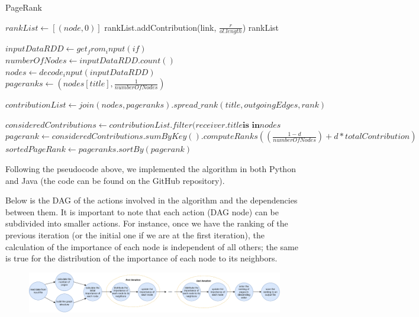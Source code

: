 \begin{algorithm}[H]
	\caption{PageRank}\label{General}
		\begin{algorithmic}[1]
			
				\State $rankList \gets [(node, 0)]$
						\State rankList.addContribution(link, $\frac{r}{ol.length}$)
					\EndFor
				\EndIf
				\State \Return rankList
			\EndProcedure
			
			
			
				\State $inputDataRDD \gets get_from_input(if)$
				\State $numberOfNodes \gets inputDataRDD.count()$
				\State $nodes \gets decode_input(inputDataRDD)$
				\State $pageranks \gets (nodes[title], \frac{1}{numberOfNodes})$
				
					\State $contributionList \gets join(nodes, pageranks).spread\_rank(title, outgoingEdges, rank)$
		
					\State $consideredContributions \gets contributionList.filter(receiver.title \textbf{is in} nodes$
					\State $pagerank \gets consideredContributions.sumByKey().computeRanks((\frac{1 - d}{numberOfNodes}) + d*totalContribution)$
					\State $sortedPageRank \gets pageranks.sortBy(pagerank)$
				\EndFor
			\EndProcedure
	\end{algorithmic}
\end{algorithm}

Following the pseudocode above, we implemented the algorithm in both Python and Java (the code can be found on the GitHub repository).

\noindent Below is the DAG of the actions involved in the algorithm and the dependencies between them. It is important to note that each action (DAG node) can be subdivided into smaller actions. For instance, once we have the ranking of the previous iteration (or the initial one if we are at the first iteration), the calculation of the importance of each node is independent of all others; the same is true for the distribution of the importance of each node to its neighbors.

\begin{figure}[H]
	\includegraphics[width=\textwidth]{img/dag.png}
	\label{fig:parsingPhase}     
\end{figure}

